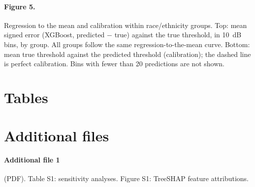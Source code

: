 \documentclass[11pt]{article}
\begin{document}
\paragraph{Figure 5.} Regression to the mean and calibration within race/ethnicity groups. Top: mean signed error (XGBoost, predicted $-$ true) against the true threshold, in 10~dB bins, by group. All groups follow the same regression-to-the-mean curve. Bottom: mean true threshold against the predicted threshold (calibration); the dashed line is perfect calibration. Bins with fewer than 20 predictions are not shown.

\clearpage
\section*{Tables}





\clearpage

\section*{Additional files}
\paragraph{Additional file 1} (PDF). Table S1: sensitivity analyses. Figure S1: TreeSHAP feature attributions.
\end{document}
